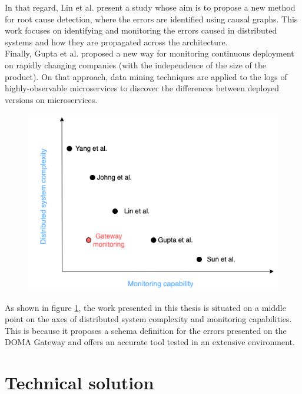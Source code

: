 \documentclass[english, 12pt, a4paper, sci, utf8, a-1b, online]{aaltothesis}
\begin{document}
In that regard, Lin et al. \cite{lin2018microscope} present a study whose aim is to propose a new method for root cause detection, where the errors are identified using causal graphs. This work focuses on identifying and monitoring the errors caused in distributed systems and how they are propagated across the architecture.\\

Finally, Gupta et al. \cite{gupta2018runtime} proposed a new way for monitoring continuous deployment on rapidly changing companies (with the independence of the size of the product). On that approach, data mining techniques are applied to the logs of highly-observable microservices to discover the differences between deployed versions on microservices.\\

\begin{figure}[h!]
    \centering
    \includegraphics[scale=0.4]{src/thesis/img/literature-review/literature-review.png}
    \label{fig:literature-review-comparison}
\end{figure}

As shown in figure \ref{fig:literature-review-comparison}, the work presented in this thesis is situated on a middle point on the axes of distributed system complexity and monitoring capabilities. This is because it proposes a schema definition for the errors presented on the DOMA Gateway and offers an accurate tool tested in an extensive environment.\\

\clearpage
\section{Technical solution}
\end{document}
